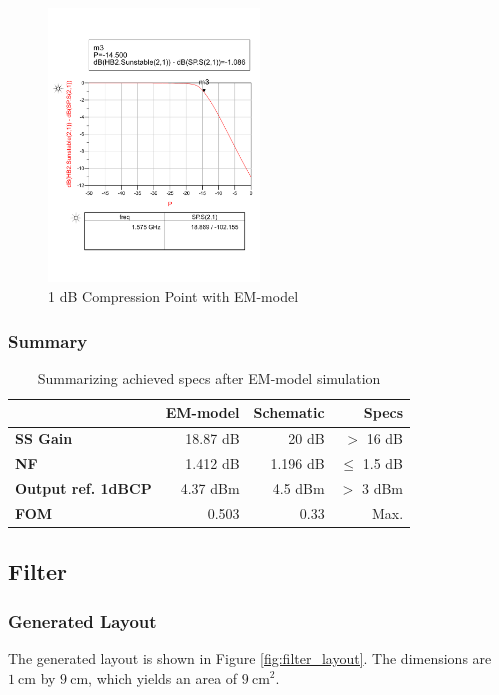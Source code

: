 \documentclass[a4paper]{article}        %
\begin{document}
			\begin{figure}[H]
			\centering
				\includegraphics[width=0.5\textwidth]{fig/LNA/compression_post.pdf}
			\caption{1 dB Compression Point with EM-model}
			\label{fig:lna_1db_post}
			\end{figure}

		\subsubsection{Summary}

			\begin{table}[H]
			\centering
			\begin{tabular}{|l|r|r|r|}
				\hline
				 &  \textbf{EM-model} &  \textbf{Schematic} & \textbf{Specs} \\
				\hline
				\textbf{SS Gain} & 18.87 dB &  20 dB & $>$ 16 dB \\
				\hline
				\textbf{NF} & 1.412 dB & 1.196 dB & $\leq$ 1.5 dB \\
				\hline
				\textbf{Output ref. 1dBCP} & 4.37 dBm & 4.5 dBm & $>$ 3 dBm \\
				\hline
				\textbf{FOM} & 0.503 & 0.33 & Max. \\
				\hline
			\end{tabular}
			\caption{Summarizing achieved specs after EM-model simulation}
			\label{tab:lna_em_summ}
			\end{table}


	\subsection{Filter}
		\subsubsection{Generated Layout}
			The generated layout is shown in Figure \ref{fig:filter_layout}. The dimensions are $\SI{1}{\centi\meter}$ by $\SI{9}{\centi\meter}$, which yields an area of $\SI{9}{\centi\meter\squared}$. 
\end{document}
